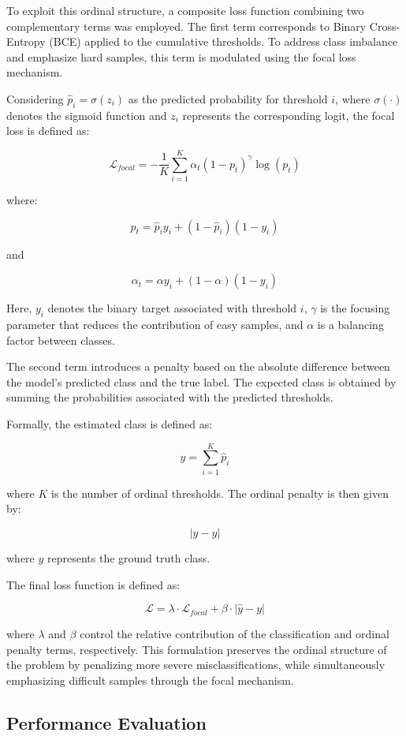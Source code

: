 To exploit this ordinal structure, a composite loss function combining two complementary terms was employed.  
The first term corresponds to Binary Cross-Entropy (BCE) applied to the cumulative thresholds.  
To address class imbalance and emphasize hard samples, this term is modulated using the focal loss mechanism.

Considering $\hat{p}_i = \sigma(z_i)$ as the predicted probability for threshold $i$, where $\sigma(\cdot)$ denotes the sigmoid function and $z_i$ represents the corresponding logit, the focal loss is defined as:

\[
\mathcal{L}_{focal} = - \frac{1}{K} \sum_{i=1}^{K}
\alpha_t (1 - p_t)^{\gamma} \log(p_t)
\]

where:

\[
p_t = \hat{p}_i y_i + (1 - \hat{p}_i)(1 - y_i)
\]

and

\[
\alpha_t = \alpha y_i + (1 - \alpha)(1 - y_i)
\]

Here, $y_i$ denotes the binary target associated with threshold $i$, $\gamma$ is the focusing parameter that reduces the contribution of easy samples, and $\alpha$ is a balancing factor between classes.

The second term introduces a penalty based on the absolute difference between the model's predicted class and the true label.  
The expected class is obtained by summing the probabilities associated with the predicted thresholds.

Formally, the estimated class is defined as:

\[
\hat{y} = \sum_{i=1}^{K} \hat{p}_i
\]

where $K$ is the number of ordinal thresholds.  
The ordinal penalty is then given by:

\[
|\hat{y} - y|
\]

where $y$ represents the ground truth class.

The final loss function is defined as:

\[
\mathcal{L} = \lambda \cdot \mathcal{L}_{focal} + \beta \cdot |\hat{y} - y|
\]

where $\lambda$ and $\beta$ control the relative contribution of the classification and ordinal penalty terms, respectively.  
This formulation preserves the ordinal structure of the problem by penalizing more severe misclassifications, while simultaneously emphasizing difficult samples through the focal mechanism.

\subsection{Performance Evaluation}

